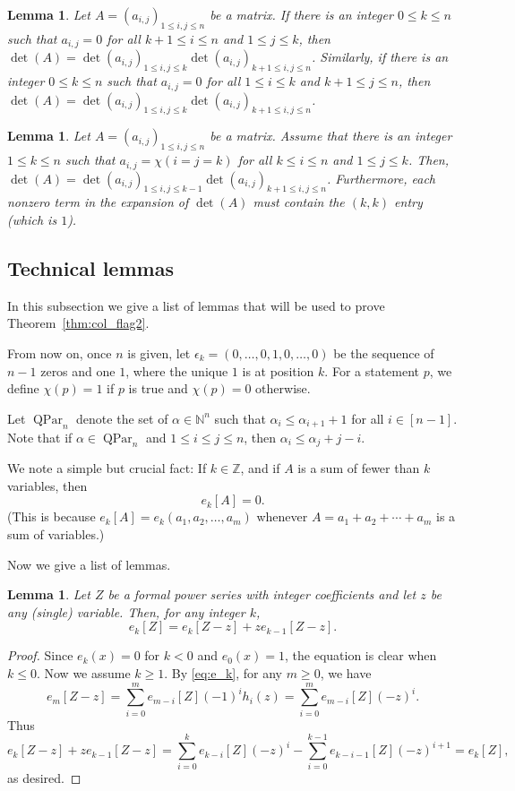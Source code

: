 \documentclass[12pt]{amsart}
\numberwithin{equation}{section}
\newtheorem{lem}[thm]{Lemma}
\theoremstyle{definition}
\newcommand\ZZ{\mathbb{Z}}
\newcommand\NN{\mathbb{N}}
\newcommand\QPar{\operatorname{QPar}}
\begin{document}
\begin{lem}\label{lem:det=detdet}
  Let $A=(a_{i,j})_{1\le i,j\le n}$ be a matrix. If there is an integer $0\le
  k\le n$ such that $a_{i,j}=0$ for all $k+1\le i\le n$ and $1\le j\le k$, then
  $\det(A)= \det (a_{i,j})_{1\le i,j\le k} \det (a_{i,j})_{k+1\le i,j\le n}$.
  Similarly, if there is an integer $0\le k\le n$ such that
  $a_{i,j}=0$ for all $1\le i\le k$ and $k+1\le j\le n$, then
  $\det(A)= \det (a_{i,j})_{1\le i,j\le k} \det (a_{i,j})_{k+1\le i,j\le n}$.
\end{lem}

\begin{lem}\label{lem:det=det1det}
  Let $A=(a_{i,j})_{1\le i,j\le n}$ be a matrix. Assume that there is
  an integer $1 \le k\le n$ such that $a_{i,j}= \chi(i=j=k)$ for all
  $k\le i\le n$ and $1\le j\le k$. Then,
  $\det(A)= \det (a_{i,j})_{1\le i,j\le k-1} \det (a_{i,j})_{k+1\le i,j\le n}$.
  Furthermore, each nonzero term in the expansion of $\det(A)$
  must contain the $(k,k)$ entry (which is $1$).
\end{lem}


\subsection{Technical lemmas}
\label{sec:technical-lemmas}

In this subsection we give a list of lemmas that will be used to prove
Theorem~\ref{thm:col_flag2}.

From now on, once $n$ is given, let $\epsilon_k=(0,\dots,0,1,0,\dots,0)$ be the
sequence of $n-1$ zeros and one $1$, where the unique $1$ is at position $k$.
For a statement $p$, we define $\chi(p)=1$ if $p$ is true and $\chi(p)=0$
otherwise. 

Let $\QPar_n$ denote the set of $\alpha\in\NN^n$ such that $\alpha_i\le
\alpha_{i+1}+1$ for all $i\in[n-1]$. Note that if $\alpha\in\QPar_n$ and $1\le
i\le j\le n$, then $\alpha_i\le \alpha_j +j-i$.

We note a simple but crucial fact:
If $k \in \ZZ$, and if $A$ is a sum of fewer than $k$ variables,
then
\begin{equation}
\label{eq:ekA=0}
e_k[A] = 0.
\end{equation}
(This is because $e_k[A] = e_k\left(a_1, a_2, \ldots, a_m\right)$
whenever $A = a_1 + a_2 + \cdots + a_m$ is a sum of variables.)


Now we give a list of lemmas.


\begin{lem}\label{lem:e_k[Z]}
  Let $Z$ be a formal power series with integer coefficients and let $z$ be any
  (single) variable. Then, for any integer $k$,
  \[
e_k[Z] = e_k[Z-z] + z e_{k-1}[Z-z].
  \]
\end{lem}
\begin{proof}
  Since $e_k(x)=0$ for $k<0$ and $e_0(x)=1$, the equation is clear when $k\le
  0$. Now we assume $k\ge1$. By \eqref{eq:e_k}, for any $m\ge0$, we have
  \[
e_m[Z-z] = \sum_{i=0}^m e_{m-i}[Z](-1)^ih_i(z)=\sum_{i=0}^m e_{m-i}[Z](-z)^i.
  \]
  Thus
  \[
    e_k[Z-z] + z e_{k-1}[Z-z] = \sum_{i=0}^k e_{k-i}[Z](-z)^i
    -\sum_{i=0}^{k-1} e_{k-i-1}[Z](-z)^{i+1} = e_k[Z],
  \]
  as desired.
\end{proof}
\end{document}
